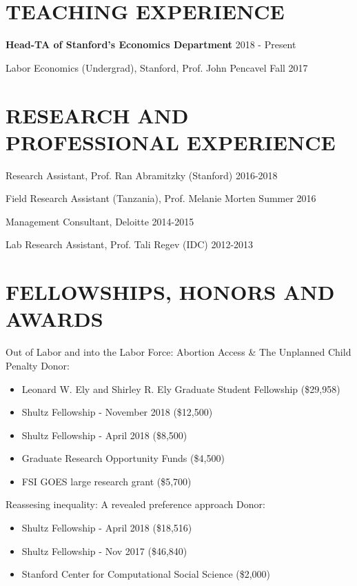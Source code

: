 \documentclass[margin]{res} %
\begin{document}
\begin{resume}
\section{TEACHING EXPERIENCE}

 \textbf{Head-TA of Stanford's Economics Department} \hfill 2018 - Present

 Labor Economics (Undergrad), Stanford, Prof. John Pencavel \hfill Fall 2017

 
\section{RESEARCH AND PROFESSIONAL EXPERIENCE}
 Research Assistant, Prof. Ran Abramitzky (Stanford) \hfill 2016-2018

 Field Research Assistant (Tanzania), Prof. Melanie Morten \hfill Summer 2016
 
 Management Consultant, Deloitte \hfill 2014-2015 

 Lab Research Assistant, Prof. Tali Regev (IDC) \hfill 2012-2013


\section{FELLOWSHIPS, HONORS AND AWARDS}

Out of Labor and into the Labor Force: Abortion Access \& The Unplanned Child Penalty
Donor: 
\begin{itemize}
	\item Leonard W. Ely and Shirley R. Ely Graduate Student Fellowship (\$29,958)
	\item Shultz Fellowship - November 2018 (\$12,500)
    \item Shultz Fellowship - April 2018 (\$8,500)
    \item Graduate Research Opportunity Funds (\$4,500)
    \item FSI GOES large research grant (\$5,700)
\end{itemize}	

Reassesing inequality: A revealed preference approach
Donor: 
\begin{itemize}
	\item Shultz Fellowship - April 2018 (\$18,516)
	\item Shultz Fellowship - Nov 2017 (\$46,840)
	\item Stanford Center for Computational Social Science (\$2,000) 
\end{itemize}	


\end{resume}
\end{document}
